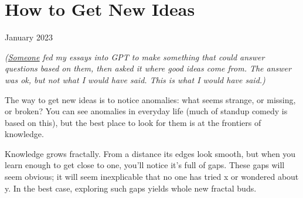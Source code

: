 \chapter{How to Get New Ideas}


            
              
                

January 2023

\emph{(\href{https://twitter.com/stef/status/1617222428727586816}{\underline{Someone}}
                    fed my essays into GPT to make something that could answer
                    questions based on them, then asked it where good ideas come
                    from. The answer was ok, but not what I would have said.
                    This is what I would have said.)}

The way to get new ideas is to notice anomalies:
                  what seems strange, or missing, or broken? You can see
                  anomalies in everyday life (much of standup comedy is based on
                  this), but the best place to look for them is at the frontiers
                  of knowledge.

Knowledge grows fractally. From a
                  distance its edges look smooth, but when you learn enough to
                  get close to one, you'll notice it's full of gaps. These gaps
                  will seem obvious; it will seem inexplicable that no one has
                  tried x or wondered about y. In the best case, exploring such
                  gaps yields whole new fractal buds.


              
            
          
            
              
                


                  
              
            
          
